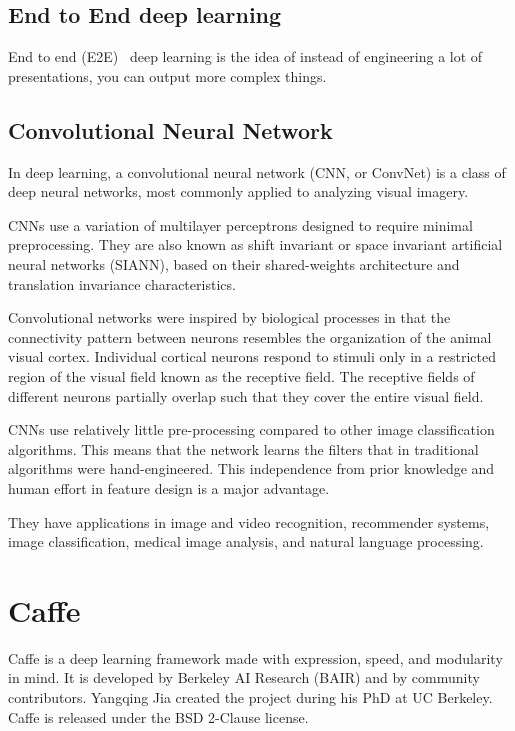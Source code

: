 \documentclass[conference]{IEEEtran}
\begin{document}
\subsection{End to End deep learning}
End to end (E2E)~\cite{b2} deep learning is the idea of instead of engineering a lot of presentations, you can output more complex things.\par


\subsection{Convolutional Neural Network}
In deep learning, a convolutional neural network (CNN, or ConvNet) is a class of deep neural networks, most commonly applied to analyzing visual imagery.\par

CNNs use a variation of multilayer perceptrons designed to require minimal preprocessing. They are also known as shift invariant or space invariant artificial neural networks (SIANN), based on their shared-weights architecture and translation invariance characteristics.\par

Convolutional networks were inspired by biological processes in that the connectivity pattern between neurons resembles the organization of the animal visual cortex. Individual cortical neurons respond to stimuli only in a restricted region of the visual field known as the receptive field. The receptive fields of different neurons partially overlap such that they cover the entire visual field.\par

CNNs use relatively little pre-processing compared to other image classification algorithms. This means that the network learns the filters that in traditional algorithms were hand-engineered. This independence from prior knowledge and human effort in feature design is a major advantage.\par

They have applications in image and video recognition, recommender systems, image classification, medical image analysis, and natural language processing.
~\cite{b5}

\section{Caffe}
Caffe is a deep learning framework made with expression, speed, and modularity in mind. It is developed by Berkeley AI Research (BAIR) and by community contributors. Yangqing Jia created the project during his PhD at UC Berkeley. Caffe is released under the BSD 2-Clause license.
\end{document}
